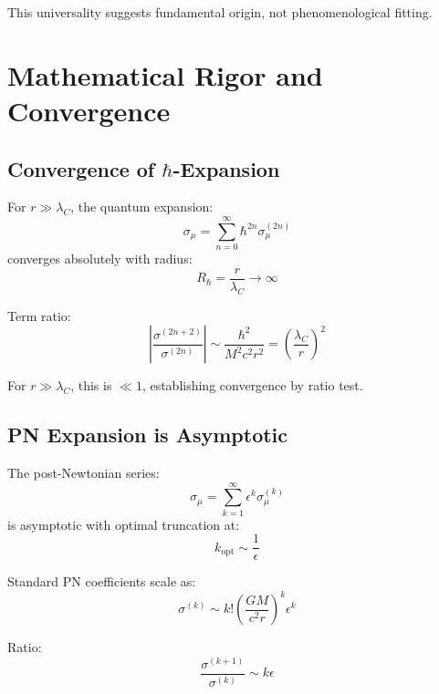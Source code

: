 \documentclass[11pt,a4paper]{article}
\theoremstyle{definition}
\theoremstyle{remark}
\begin{document}
	This universality suggests fundamental origin, not phenomenological fitting.
	
	\section{Mathematical Rigor and Convergence}
	
	\subsection{Convergence of $\hbar$-Expansion}
	
		For $r \gg \lambda_C$, the quantum expansion:
		\begin{equation}
			\sigma_\mu = \sum_{n=0}^\infty \hbar^{2n}\sigma_\mu^{(2n)}
		\end{equation}
		converges absolutely with radius:
		\begin{equation}
			R_{\hbar} = \frac{r}{\lambda_C} \to \infty
		\end{equation}
	
		Term ratio:
		\begin{equation}
			\left|\frac{\sigma^{(2n+2)}}{\sigma^{(2n)}}\right| \sim \frac{\hbar^2}{M^2c^2r^2} = \left(\frac{\lambda_C}{r}\right)^2
		\end{equation}
		
		For $r \gg \lambda_C$, this is $\ll 1$, establishing convergence by ratio test.
	
	\subsection{PN Expansion is Asymptotic}
	
		The post-Newtonian series:
		\begin{equation}
			\sigma_\mu = \sum_{k=1}^\infty \epsilon^k\sigma_\mu^{(k)}
		\end{equation}
		is asymptotic with optimal truncation at:
		\begin{equation}
			k_{\text{opt}} \sim \frac{1}{\epsilon}
		\end{equation}
	
		Standard PN coefficients scale as:
		\begin{equation}
			\sigma^{(k)} \sim k!\left(\frac{GM}{c^2r}\right)^k \epsilon^k
		\end{equation}
		
		Ratio:
		\begin{equation}
			\frac{\sigma^{(k+1)}}{\sigma^{(k)}} \sim k\epsilon
		\end{equation}
		
\end{document}
